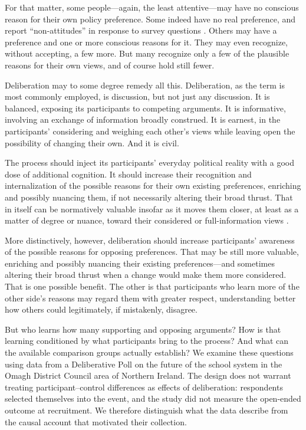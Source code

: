 \documentclass{article}
\begin{document}
For that matter, some people---again, the least attentive---may have no conscious reason for
their own policy preference. Some indeed have no real preference, and report ``non-attitudes''
in response to survey questions \citep{converse1964nature,converse1970attitudes}. Others may have a preference
and one or more conscious reasons for it. They may even recognize, without accepting, a few
more. But many recognize only a few of the plausible reasons for their own views, and of course
hold still fewer.

Deliberation may to some degree remedy all this. Deliberation, as the term is most commonly
employed, is discussion, but not just any discussion. It is balanced, exposing its participants
to competing arguments. It is informative, involving an exchange of information broadly
construed. It is earnest, in the participants' considering and weighing each other's views while
leaving open the possibility of changing their own. And it is civil.

The process should inject its participants' everyday political reality with a good dose of
additional cognition. It should increase their recognition and internalization of the possible
reasons for their own existing preferences, enriching and possibly nuancing them, if not
necessarily altering their broad thrust. That in itself can be normatively valuable insofar as
it moves them closer, at least as a matter of degree or nuance, toward their considered or
full-information views \citep{tocqueville1969democracy,fishkin1991democracy,
dahl1989democracy,arendt1968truth}.

More distinctively, however, deliberation should increase participants' awareness of the
possible reasons for opposing preferences. That may be still more valuable, enriching and
possibly nuancing their existing preferences---and sometimes altering their broad thrust when
a change would make them more considered. That is one possible benefit. The other is that
participants who learn more of the other side's reasons may regard them with greater respect,
understanding better how others could legitimately, if mistakenly, disagree.

But who learns how many supporting and opposing arguments? How is that learning conditioned
by what participants bring to the process? And what can the available comparison groups
actually establish? We examine these questions using data from a Deliberative Poll on the
future of the school system in the Omagh District Council area of Northern Ireland. The design
does not warrant treating participant--control differences as effects of deliberation:
respondents selected themselves into the event, and the study did not measure the open-ended
outcome at recruitment. We therefore distinguish what the data describe from the causal account
that motivated their collection.
\end{document}
